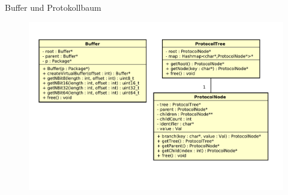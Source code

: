 \begin{frame}{Buffer und Protokollbaum}
    \begin{figure}
    	\centering
    	\includegraphics[height=0.8\textheight]{./images/buffer/buffer_and_proto.pdf}
    \end{figure}
\end{frame}
